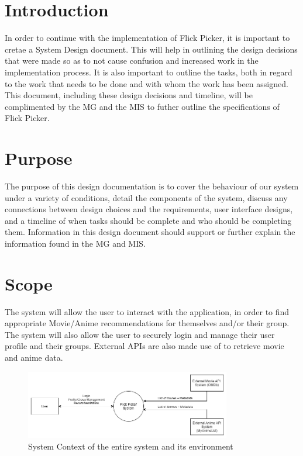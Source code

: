 \documentclass[12pt, titlepage]{article}
\begin{document}
\section{Introduction}
\hspace*{14pt} In order to continue with the implementation of Flick Picker, it is important to cretae a System Design document. This will help in outlining the design decisions that were made so as to not cause confusion and increased work in the implementation process. It is also important to outline the tasks, both in regard to the work that needs to be done and with whom the work has been assigned. This document, including these design decisions and timeline, will be complimented by the MG and the MIS to futher outline the specifications of Flick Picker. 

\section{Purpose}
\hspace*{14pt} The purpose of this design documentation is to cover the behaviour of our system under a variety of conditions, detail the components of the system, discuss any connections between design choices and the requirements, user interface designs, and a timeline of when tasks should be complete and who should be completing them. Information in this design document should support or further explain the information found in the MG and MIS.

\section{Scope}

The system will allow the user to interact with the application, in order to find appropriate Movie/Anime recommendations for themselves and/or their group. The system will also allow the user to securely login and manage their user profile and their groups. External APIs are also made use of to retrieve movie and anime data.

\begin{figure}[H]
	\centering
	\includegraphics[width=0.8\textwidth]{SystemContext.png}
	\caption{System Context of the entire system and its environment}
	\label{FigUH}
\end{figure}
\end{document}
